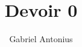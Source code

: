 \documentclass[12pt,solution=true]{uqtrassignment}
\title{Devoir 0}
\author{Gabriel Antonius}
\begin{document}
\maketitle

\begin{problem}{}

\begin{solution}
\end{solution}
\end{problem}
\end{document}
